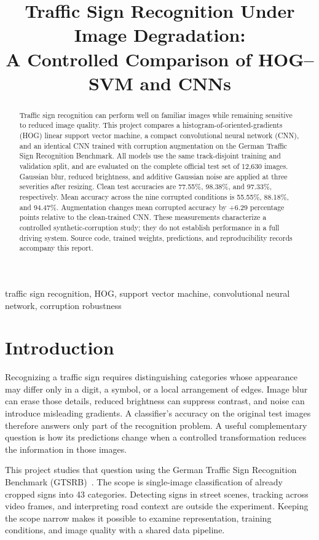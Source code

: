 \documentclass[conference]{IEEEtran}
\begin{document}
\title{Traffic Sign Recognition Under Image Degradation:\\A Controlled Comparison of HOG--SVM and CNNs}
\author{}
\maketitle
\begin{abstract}
Traffic sign recognition can perform well on familiar images while remaining sensitive to reduced image quality. This project compares a histogram-of-oriented-gradients (HOG) linear support vector machine, a compact convolutional neural network (CNN), and an identical CNN trained with corruption augmentation on the German Traffic Sign Recognition Benchmark. All models use the same track-disjoint training and validation split, and are evaluated on the complete official test set of 12,630 images. Gaussian blur, reduced brightness, and additive Gaussian noise are applied at three severities after resizing. Clean test accuracies are 77.55\%, 98.38\%, and 97.33\%, respectively. Mean accuracy across the nine corrupted conditions is 55.55\%, 88.18\%, and 94.47\%. Augmentation changes mean corrupted accuracy by +6.29 percentage points relative to the clean-trained CNN. These measurements characterize a controlled synthetic-corruption study; they do not establish performance in a full driving system. Source code, trained weights, predictions, and reproducibility records accompany this report.
\end{abstract}
\begin{IEEEkeywords}
traffic sign recognition, HOG, support vector machine, convolutional neural network, corruption robustness
\end{IEEEkeywords}

\section{Introduction}
Recognizing a traffic sign requires distinguishing categories whose appearance may differ only in a digit, a symbol, or a local arrangement of edges. Image blur can erase those details, reduced brightness can suppress contrast, and noise can introduce misleading gradients. A classifier's accuracy on the original test images therefore answers only part of the recognition problem. A useful complementary question is how its predictions change when a controlled transformation reduces the information in those images.

This project studies that question using the German Traffic Sign Recognition Benchmark (GTSRB)~\cite{gtsrb}. The scope is single-image classification of already cropped signs into 43 categories. Detecting signs in street scenes, tracking across video frames, and interpreting road context are outside the experiment. Keeping the scope narrow makes it possible to examine representation, training conditions, and image quality with a shared data pipeline.
\end{document}
